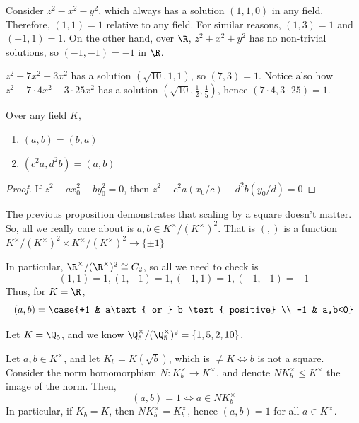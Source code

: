 \begin{ex}
    Consider $z^2-x^2-y^2$, which always has a solution $(1,1,0)$ in any field. Therefore, $(1,1)=1$ relative to any field. For similar reasons, $(1,3)=1$ and $(-1,1)=1$. On the other hand, over $\R$, $z^2+x^2+y^2$ has no non-trivial solutions, so $(-1,-1)=-1$ in $\R$.

    $z^2-7x^2-3x^2$ has a solution $(\sqrt{10}, 1, 1)$, so $(7,3)=1$. Notice also how $z^2-7\cdot 4x^2 - 3\cdot 25x^2$ has a solution $(\sqrt{10}, \frac{1}{2},\frac{1}{5})$, hence $(7 \cdot 4, 3 \cdot 25)=1$.
\end{ex}

\begin{prop}
    Over any field $K$,
    \begin{enumerate}
        \item $(a,b)=(b,a)$
        \item $(c^2a,d^2b)=(a,b)$
    \end{enumerate}
\end{prop}
\begin{proof}
    If $z^2-ax_0^2-by_0^2=0$, then $z^2-c^2a(x_0/c)-d^2b(y_0/d)=0$
\end{proof}

\begin{cor}
    The previous proposition demonstrates that scaling by a square doesn't matter. So, all we really care about is $a,b \in K^\times /(K^\times)^2$. That is $(,)$ is a function $K^\times /(K^\times)^2 \times K^\times / (K^\times)^2 \to \{\pm 1\}$

    In particular, $\R^\times / (\R^\times)^2 \cong C_2$, so all we need to check is
    $$(1,1)=1,(1,-1)=1,(-1,1)=1,(-1,-1)=-1$$
    Thus, for $K=\R$,
    $$(a,b) = \case{+1 & a\text{ or } b \text{ positive} \\ -1 & a,b<0}$$
\end{cor}

\begin{ex}
    Let $K = \Q_5$, and we know $\Q_5^\times / (\Q_5 ^\times)^2=\{1,5,2,10\}$.
\end{ex}

\begin{prop}
    Let $a,b \in K^\times$, and let $K_b = K(\sqrt b)$, which is $\neq K \iff b$ is not a square. Consider the norm homomorphism $N:K_b^\times \to K^\times$, and denote $NK_b^\times \leq K^\times$ the image of the norm. Then,
    $$(a,b)=1 \iff a \in NK_b^\times$$
    In particular, if $K_b = K$, then $NK_b^\times = K_b^\times$, hence $(a,b)=1$ for all $a \in K^\times$.
\end{prop}

